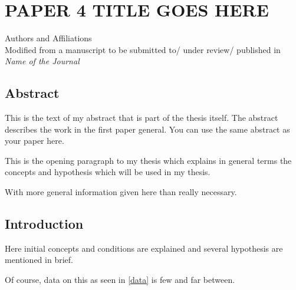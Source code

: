 \chapter{PAPER 4 TITLE GOES HERE}

\begin{center}
    Authors and Affiliations \\
    Modified from a manuscript to be submitted to/ under review/ published in \textit{Name of the Journal}
\end{center}

\section{Abstract}
This is the text of my abstract that is part of the thesis itself.
The abstract describes the work in the first paper general. You can use the same abstract as your paper here.



This is the opening paragraph to my thesis which
explains in general terms the concepts and hypothesis
which will be used in my thesis.

With more general information given here than really
necessary.

\section{Introduction}

Here initial concepts and conditions are explained and
several hypothesis are mentioned in brief.

Of course, data on this as seen in \autoref{data}
is few and far between.

